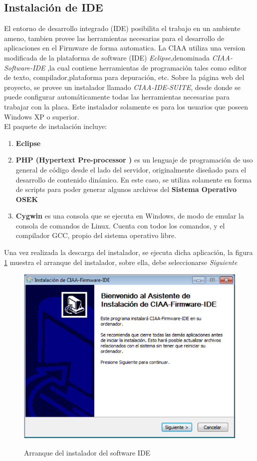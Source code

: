 \documentclass[12pt,letterpaper]{article}
\begin{document}
\subsection{Instalación de IDE}
El entorno de desarrollo integrado (IDE) posibilita el trabajo en un ambiente ameno, tambien provee las herramientas necesarias para el desarrollo de aplicaciones en el Firmware de forma automatica. La CIAA utiliza una version modificada de la plataforma de software (IDE)  \textit{Eclipse},denominada \textit{CIAA-Software-IDE} ,la cual contiene herramientas de programación tales como editor de texto, compilador,plataforma para depuración, etc.
Sobre la página web del proyecto, se provee un instalador llamado \textit{CIAA-IDE-SUITE}, desde donde se puede configurar automáticamente todas las herramientas necesarias para trabajar con la placa. Este instalador solamente es para los usuarios que poseen Windows XP o superior.\\

El paquete de instalación incluye:
\begin{enumerate}
\item \textbf{Eclipse}
\item\textbf{PHP (Hypertext Pre-processor )} es un lenguaje de programación de uso general de código desde el lado del servidor, originalmente diseñado para el desarrollo de contenido dinámico. En este caso, se utiliza solamente en forma de scripts para poder generar algunos archivos del \textbf{Sistema Operativo OSEK}
\item \textbf{Cygwin} es una consola que se ejecuta en Windows, de modo de emular la consola de comandos de Linux. Cuenta con todos los comandos, y el compilador GCC, propio del sistema operativo libre.
\end{enumerate}

Una vez realizada la descarga del instalador, se ejecuta dicha aplicación, la figura \ref{Fig4} muestra el arranque del instalador, sobre ella, debe seleccionarse \textit{Siguiente} 

\begin{figure}[!h]
\centering
\includegraphics[width=8 cm]{figuras/instalacion1.png}\\
\caption{Arranque del instalador del software IDE}
\label{Fig4}
\end{figure}
\end{document}
